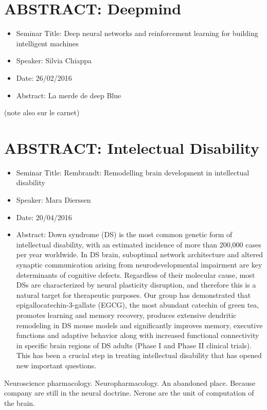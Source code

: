 \documentclass[10pt,letterpaper]{article}
\begin{document}
\section{ABSTRACT: Deepmind}
\begin{itemize}
    \item Seminar Title: Deep neural networks and reinforcement learning for building intelligent machines
    \item Speaker: Silvia Chiappa
    \item Date: 26/02/2016
    \item Abstract: La merde de deep Blue
\end{itemize}
(note also sur le carnet)


\section{ABSTRACT: Intelectual Disability }
\begin{itemize}
    \item Seminar Title: Rembrandt: Remodelling brain development in intellectual disability 
    \item Speaker: Mara Dierssen
    \item Date: 20/04/2016
    \item Abstract: Down syndrome (DS) is the most common genetic form of intellectual disability, with an estimated incidence of more than 200,000 cases per year worldwide. In DS brain, suboptimal network architecture and altered synaptic communication arising from neurodevelopmental impairment are key determinants of cognitive defects. Regardless of their molecular cause, most DSs are characterized by neural plasticity disruption, and therefore this is a natural target for therapeutic purposes. Our group has demonstrated that epigallocatechin-3-gallate (EGCG), the most abundant catechin of green tea, promotes learning and memory recovery, produces extensive dendritic remodeling in DS mouse models and significantly improves memory, executive functions and adaptive behavior along with increased functional connectivity in specific brain regions of DS adults (Phase I and Phase II clinical trials). This has been a crucial step in treating intellectual disability that has opened new important questions. 
\end{itemize}

Neuroscience pharmacology. Neuropharmacology.
An abandoned place. Because company are still in the neural doctrine. Nerone are the unit of computation of the brain.
\end{document}
